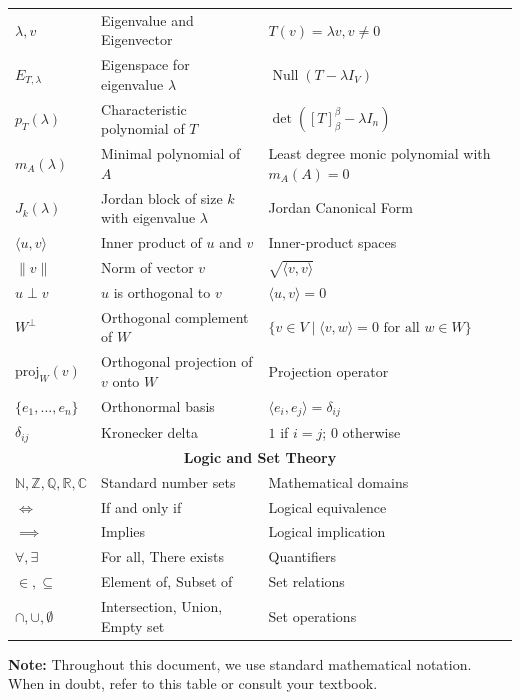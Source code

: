\begin{center}
\begin{tabularx}{\textwidth}{|l|X|X|}
\hline
$\lambda, v$ & Eigenvalue and Eigenvector & $T(v) = \lambda v, v \neq 0$ \\
$E_{T,\lambda}$ & Eigenspace for eigenvalue $\lambda$ & $\operatorname{Null}(T - \lambda I_V)$ \\
$p_T(\lambda)$ & Characteristic polynomial of $T$ & $\det([T]^{\beta}_{\beta} - \lambda I_n)$ \\
$m_A(\lambda)$ & Minimal polynomial of $A$ & Least degree monic polynomial with $m_A(A) = 0$ \\
$J_k(\lambda)$ & Jordan block of size $k$ with eigenvalue $\lambda$ & Jordan Canonical Form \\
$\langle u, v \rangle$ & Inner product of $u$ and $v$ & Inner-product spaces \\
$\|v\|$ & Norm of vector $v$ & $\sqrt{\langle v, v \rangle}$ \\
$u \perp v$ & $u$ is orthogonal to $v$ & $\langle u, v \rangle = 0$ \\
$W^\perp$ & Orthogonal complement of $W$ & $\{ v \in V \mid \langle v, w \rangle = 0 \text{ for all } w \in W \}$ \\
$\text{proj}_W(v)$ & Orthogonal projection of $v$ onto $W$ & Projection operator \\
$\{e_1, \ldots, e_n\}$ & Orthonormal basis & $\langle e_i, e_j \rangle = \delta_{ij}$ \\
$\delta_{ij}$ & Kronecker delta & $1$ if $i = j$; $0$ otherwise \\
\hline
\multicolumn{3}{|c|}{\textbf{Logic and Set Theory}} \\
\hline
$\mathbb{N}, \mathbb{Z}, \mathbb{Q}, \mathbb{R}, \mathbb{C}$ & Standard number sets & Mathematical domains \\
$\iff$ & If and only if & Logical equivalence \\
$\implies$ & Implies & Logical implication \\
$\forall, \exists$ & For all, There exists & Quantifiers \\
$\in, \subseteq$ & Element of, Subset of & Set relations \\
$\cap, \cup, \emptyset$ & Intersection, Union, Empty set & Set operations \\
\hline
\end{tabularx}
\end{center}

\vspace{0.3cm}

\noindent
\textbf{Note:} Throughout this document, we use standard mathematical notation. When in doubt, refer to this table or consult your textbook.

\newpage